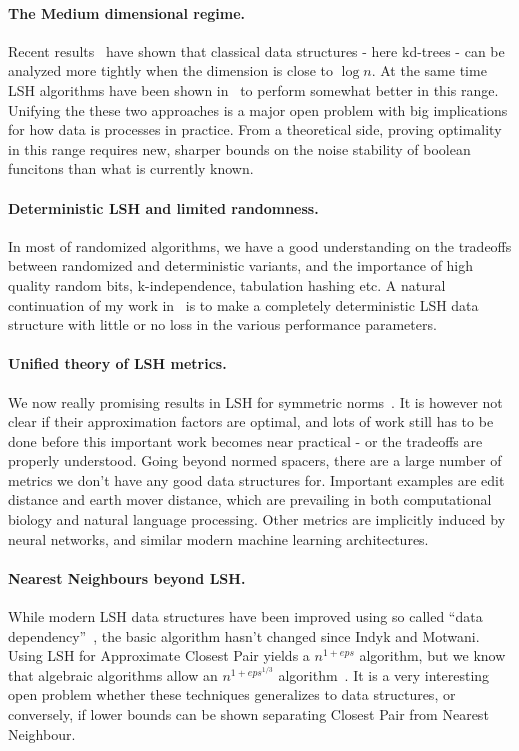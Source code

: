 \documentclass[10pt]{article}
\begin{document}
\paragraph{The Medium dimensional regime.} Recent results~\cite{DBLP:conf/compgeom/Chan17a} have shown that classical data structures - here kd-trees - can be analyzed more tightly when the dimension is close to $\log n$.
At the same time LSH algorithms have been shown in~\cite{becker2016new} to perform somewhat better in this range.
Unifying the these two approaches is a major open problem with big implications for how data is processes in practice.
From a theoretical side, proving optimality in this range requires new, sharper bounds on the noise stability of boolean funcitons than what is currently known.

\paragraph{Deterministic LSH and limited randomness.} In most of randomized algorithms, we have a good understanding on the tradeoffs between randomized and deterministic variants, and the importance of high quality random bits, k-independence, tabulation hashing etc.
A natural continuation of my work in~\cite{ahle2017optimal} is to make a completely deterministic LSH data structure with little or no loss in the various performance parameters.

\paragraph{Unified theory of LSH metrics.}
We now really promising results in LSH for symmetric norms~\cite{DBLP:journals/siamcomp/AndoniKR18}.
It is however not clear if their approximation factors are optimal, and lots of work still has to be done before this important work becomes near practical - or the tradeoffs are properly understood.
Going beyond normed spacers, there are a large number of metrics we don’t have any good data structures for.
Important examples are edit distance and earth mover distance, which are prevailing in both computational biology and natural language processing.
Other metrics are implicitly induced by neural networks, and similar modern machine learning architectures.

\paragraph{Nearest Neighbours beyond LSH.}
While modern LSH data structures have been improved using so called ``data dependency''~\cite{DBLP:journals/corr/AndoniR15, DBLP:conf/stoc/AndoniNNRW18}, the basic algorithm hasn’t changed since Indyk and Motwani.
Using LSH for Approximate Closest Pair yields a $n^{1+eps}$ algorithm, but we know that algebraic algorithms allow an $n^{1+eps^{1/3}}$ algorithm~\cite{DBLP:journals/corr/AlmanCW16}.
It is a very interesting open problem whether these techniques generalizes to data structures, or conversely, if lower bounds can be shown separating Closest Pair from Nearest Neighbour.
\end{document}
